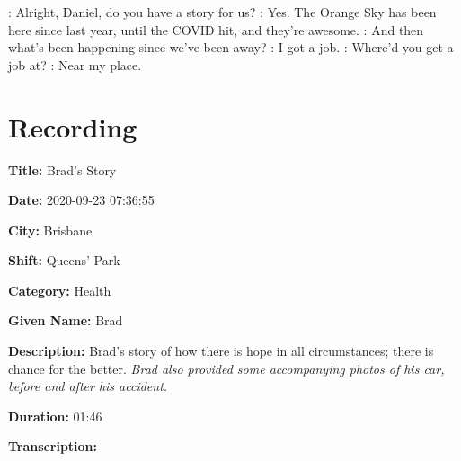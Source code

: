 {\begin{drama}

    \kelsspeaks: Alright, Daniel, do you have a story for us?
    \danspeaks: Yes. The Orange Sky has been here since last year, until the COVID hit, and they're awesome.
    \kelsspeaks: And then what's been happening since we've been away?
    \danspeaks: I got a job.
    \kelsspeaks: Where'd you get a job at?
    \danspeaks: Near my place.
\end{drama}

\tocless\section{Recording }

\textbf{Title:} Brad's Story

\textbf{Date:} 2020-09-23 07:36:55

\textbf{City:} Brisbane

\textbf{Shift:} Queens' Park

\textbf{Category:} Health

\textbf{Given Name:} Brad

\textbf{Description:} Brad's story of how there is hope in all circumstances; there is chance for the better. \emph{Brad also provided some accompanying photos of his car, before and after his accident.}

\textbf{Duration:} 01:46

\textbf{Transcription:}

\begin{drama}


\end{drama}}
